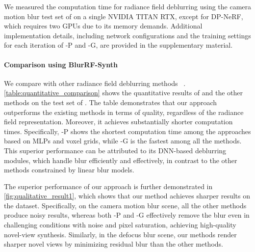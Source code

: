 We measured the computation time for radiance field deblurring using the camera motion blur test set of \SynthDataName{} on a single NVIDIA TITAN RTX, except for DP-NeRF, which requires two GPUs due to its memory demands.
Additional implementation details, including network configurations and the training settings for each iteration of \MethodName{}-P and \MethodName{}-G, are provided in the supplementary material.

\paragraph{Comparison using BlurRF-Synth}
We compare \MethodName{} with other radiance field deblurring methods ~\cite{ma2022deblurnerf, wang2023badnerf, lee2023dpnerf, lee2023exblurf, peng2023pdrf, lee2024deblurring, peng2024bags}.
\cref{table:quantitative_comparison} shows the quantitative results of \MethodName{} and the other methods on the test set of \SynthDataName{}. 
The table demonstrates that our approach outperforms the existing methods in terms of quality, regardless of the radiance field representation. 
Moreover, it achieves substantially shorter computation times. 
Specifically, \MethodName{}-P shows the shortest computation time among the approaches based on MLPs and voxel grids, while \MethodName{}-G is the fastest among all the methods. 
This superior performance can be attributed to its DNN-based deblurring modules, which handle blur efficiently and effectively, in contrast to the other methods constrained by linear blur models.

The superior performance of our approach is further demonstrated in \cref{fig:qualitative_result1}, which shows that our method achieves sharper results on the \SynthDataName{} dataset.
Specifically, on the camera motion blur scene, all the other methods produce noisy results, whereas both \MethodName{}-P and \MethodName{}-G effectively remove the blur even in challenging conditions with noise and pixel saturation, achieving high-quality novel-view synthesis.
Similarly, in the defocus blur scene, our methods render sharper novel views by minimizing residual blur than the other methods.

